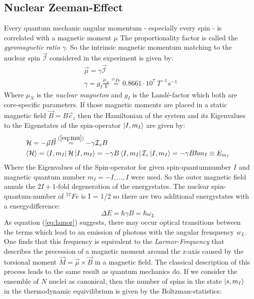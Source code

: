 	\subsection{Nuclear Zeeman-Effect}
		Every quantum mechanic angular momentum - especially every spin - is correlated with a magnetic moment $\mu$ The proportionality factor is called the \textit{gyromagnetic ratio} $\gamma$. So the intrinsic magnetic momentum matching to the nuclear spin $\vec{\mathcal{I}}$ considered in the experiment is given by:
			\begin{align}
				&\vec{\mu} = \gamma \vec{\mathcal{I}} \label{eq:mu}\\
				&\gamma  = g_I \frac{\mu_N}{\hbar} \overset{^{57}Fe}{=} 0.8661\cdot 10^{7}\ \unit{T^{-1}s^{-1}} \label{eq:gamma}
			\end{align}
		Where $\mu_N$ is the \textit{nuclear magneton} and $g_I$ is the Land\'{e}-factor which both are core-specific pa\-ra\-me\-ters. If those magnetic moments are placed in a static magnetic field $\vec{B} = B \vec{e}_z$ then the Hamiltonian of the system and its Eigenvalues to the Eigenstates of the spin-operator $\ket{I,m_I}$ are given by:
			\begin{align}
				&\mathcal{H} = - \vec{\mu} \vec{B} \overset{(\ref{eq:mu})}{=} - \gamma \mathcal{I}_zB \\
				&\langle\mathcal{H}\rangle = \bra{I,m_I}\mathcal{H}\ket{I,m_I} = -\gamma B \bra{I,m_I}\mathcal{I}_z\ket{I,m_I} = -\gamma B \hbar m_I \equiv E_{m_I}
			\end{align}
		Where the Eigenvalues of the Spin-operator for given spin-quantumnumber $I$ and magnetic quantum number $m_I = -I,\dots,I$ were used. So the outer magnetic field annuls the $2I+1$-fold degeneration of the energystates. The nuclear spin-quantum-number of $^{57}Fe$ is I = 1/2 so there are two additional energystates with a energydifference:
			\begin{equation}
				\Delta E = \hbar \gamma B = \hbar \omega_L \label{eq:lamor}
			\end{equation}
		As equation (\ref{eq:lamor}) suggests, there may occur optical transitions between the terms which lead to an emission of photons with the angular frenquency $w_L$. One finds that this frequency is equivalent to the \textit{Larmor-Frequency} that describes the precession of a magnetic moment around the z-axis caused by the torsional moment $\vec{M}=\vec{\mu}\times\vec{B}$ in a magnetic field. The classical description of this process leads to the same result as quantum mechanics do. If we consider the ensemble of $N$ nuclei as canonical, then the number of spins in the state $\ket{s,m_I}$ in the thermodynamic equivilibrium is given by the Boltzman-statistics:
